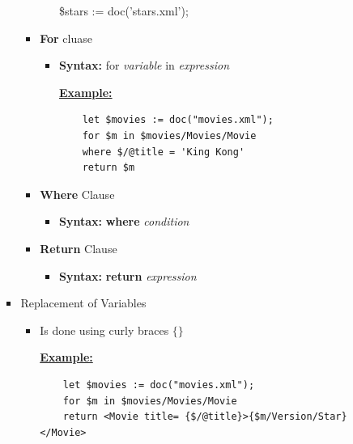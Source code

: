 \documentclass[12pt]{article}
\begin{document}
\begin{enumerate}[1.]
\begin{enumerate}[a)]
\begin{itemize}
\begin{itemize}
\begin{itemize}
                    \$stars := doc('stars.xml');

                \end{itemize}

                \item \textbf{For} cluase

                \begin{itemize}
                    \item \textbf{Syntax:} for \textit{variable} in \textit{expression}

                    \bigskip

                    \underline{\textbf{Example:}}

    \begin{lstlisting}
    let $movies := doc("movies.xml");
    for $m in $movies/Movies/Movie
    where $/@title = 'King Kong'
    return $m
    \end{lstlisting}
                \end{itemize}

                \item \textbf{Where} Clause
                \begin{itemize}
                    \item \textbf{Syntax:} \textbf{where} \textit{condition}
                \end{itemize}

                \item \textbf{Return} Clause
                \begin{itemize}
                    \item \textbf{Syntax:} \textbf{return} \textit{expression}
                \end{itemize}

            \end{itemize}

            \item Replacement of Variables
            \begin{itemize}
                \item Is done using curly braces $\{\}$

                \bigskip

                \underline{\textbf{Example:}}

    \begin{lstlisting}
    let $movies := doc("movies.xml");
    for $m in $movies/Movies/Movie
    return <Movie title= {$/@title}>{$m/Version/Star}</Movie>
    \end{lstlisting}
            \end{itemize}



\end{itemize}
\end{enumerate}
\end{enumerate}
\end{document}
